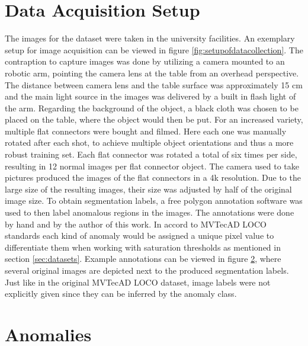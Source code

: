 



\section{Data Acquisition Setup}
\label{sec:faltconnectordataacquisiton}

The images for the dataset were taken in the university facilities. An exemplary setup for image acquisition can be viewed in figure \ref{fig:setupofdatacollection}. The contraption to capture images was 
done by utilizing a camera mounted to an robotic arm, pointing the camera lens at the table from an overhead perspective. The distance between camera lens and the table surface was approximately 15 cm and the main light source in the 
images was delivered by a built in flash light of the arm. Regarding the background of the object, a black cloth was chosen to be placed on the table, where the object would then be put. For 
an increased variety, multiple flat connectors were bought and filmed. Here each one was manually rotated after each shot, to achieve multiple object orientations and thus a more robust training 
set. Each flat connector was rotated a total of six times per side, resulting in 12 normal images per flat connector object. \newline
The camera used to take pictures produced the images of the flat connectors in a 4k resolution. Due to the large size of the resulting 
images, their size was adjusted by half of the original image size.\newline
To obtain segmentation labels, a free polygon annotation software was used to then label anomalous regions in the images. The annotations were done by hand and by the author of this work. In accord to 
MVTecAD LOCO standards \cite{LOCODentsAndScratchesBergmann2022} each kind of anomaly would be assigned a unique pixel value to differentiate them when working with saturation thresholds 
as mentioned in section \ref{sec:datasets}. Example annotations can be viewed in figure \ref{sec:flatconnectoranomalies}, where several original images are depicted next to the produced segmentation labels. Just like in the 
original MVTecAD LOCO dataset, image labels were not explicitly given since they can be inferred by the anomaly class.





\section{Anomalies}
\label{sec:flatconnectoranomalies}

